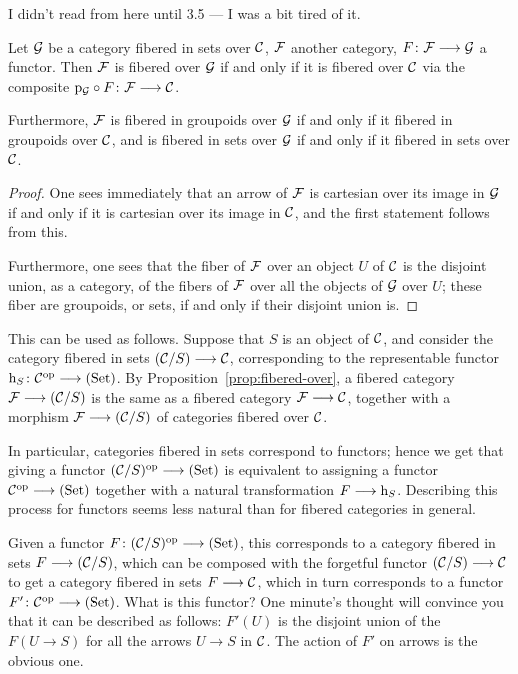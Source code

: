 \begin{3   FIBERED CATEGORIES}
\begin{3.4 Functors and cats fibered in sets}
\hfil
\begin{shaded}
I didn't read from here until 3.5 --- I was a bit tired of it.
\end{shaded}

\begin{proposition}\label{prop:fibered-over}

Let $\mathcal{G}$ be a category fibered in sets over $\mathcal{C}$, $\mathcal{F}$ another category, $F \colon \cF \arr \cG$ a functor. Then $\mathcal{F}$ is fibered over $\mathcal{G}$ if and only if it is fibered over $\mathcal{C}$ via the composite $\p_{\cG} \circ F \colon \cF \arr \cC$.

Furthermore, $\mathcal{F}$ is fibered in groupoids over $\mathcal{G}$ if and only if it fibered in groupoids over $\mathcal{C}$, and is fibered in sets over $\mathcal{G}$ if and only if it fibered in sets over $\mathcal{C}$.
\end{proposition}

\begin{proof}
One sees immediately that an arrow of $\mathcal{F}$ is cartesian over its image in $\mathcal{G}$ if and only if it is cartesian over its image in $\mathcal{C}$, and the first statement follows from this.

Furthermore, one sees that the fiber of $\mathcal{F}$ over an object $U$ of $\mathcal{C}$ is the disjoint union, as a category, of the fibers of $\mathcal{F}$ over all the objects of $\mathcal{G}$ over $U$; these fiber are groupoids, or sets, if and only if their disjoint union is.
\end{proof}

This can be used as follows. Suppose that $S$ is an object of $\mathcal{C}$, and consider the category fibered in sets $(\cC/S) \arr \cC$, corresponding to the representable functor $\h_S \colon \cC\op \arr \catset$. By Proposition~\ref{prop:fibered-over}, a fibered category $\cF \arr (\cC/S)$ is the same as a fibered category $\cF \arr \cC$, together with a morphism $\cF\arr (\cC/S)$ of categories fibered over $\mathcal{C}$.

In particular, categories fibered in sets correspond to functors; hence we get that giving a functor $(\cC/S)\op \arr \catset$ is equivalent to assigning a functor $\cC\op \arr \catset$ together with a natural transformation $F \arr \h_{S}$. Describing this process for functors seems less natural than for fibered categories in general.

Given a functor $F \colon (\cC/S)\op \arr \catset$, this corresponds to a category fibered in sets $F \arr (\cC/S)$, which can be composed with the forgetful functor $(\cC/S) \arr \cC$ to get a category fibered in sets $F \arr \cC$, which in turn corresponds to a functor $F' \colon \cC\op \arr \catset$. What is this functor? One minute's thought will convince you that it can be described as follows: $F'(U)$ is the disjoint union of the $F(U \to S)$ for all the arrows $U \to S$ in $\mathcal{C}$. The action of $F'$ on arrows is the obvious one.




\end{3.4 Functors and cats fibered in sets}
\end{3   FIBERED CATEGORIES}
